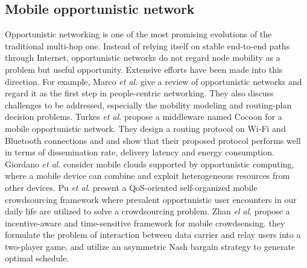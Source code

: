 \documentclass[journal]{IEEEtran}
\begin{document}
\subsection{Mobile opportunistic network}
Opportunistic networking is one of the most promising evolutions of the traditional multi-hop one. 
Instead of relying itself on stable end-to-end paths through Internet, opportunistic networks do not regard node mobility as a problem but useful opportunity. 
Extensive efforts have been made into this direction. For example, Marco \emph{et al}. \cite{Conti2014} give a review of opportunistic networks and regard it as the first step in people-centric networking. They also discuss challenges to be addressed, especially the mobility modeling and routing-plan decision problems.
Turkes \emph{et al}. \cite{turkes2016cocoon} propose a middleware named Cocoon for a mobile opportunistic network. They design a routing protocol on Wi-Fi and Bluetooth connections and and show that their proposed protocol performs well in terms of dissemination rate, delivery latency and energy consumption.
Giordano \emph{et al}. \cite{giordano2011human} consider mobile clouds supported by opportunistic computing, where a mobile device can combine and exploit heterogeneous resources from other devices.
Pu \emph{et al}. \cite{Pu2017crowd} present a QoS-oriented self-organized mobile crowdsourcing framework where prevalent opportunistic user encounters in our daily life are utilized to solve a crowdsourcing problem.
Zhan \emph{el al}. \cite{zhan2017time} propose a incentive-aware and time-sensitive framework for mobile crowdsensing. they formulate the problem of interaction between data carrier and relay users into a two-player game, and utilize an asymmetric Nash bargain strategy to generate optimal schedule.
\end{document}
